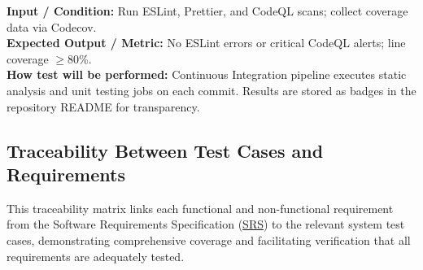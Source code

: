 \documentclass[12pt, titlepage]{article}
\begin{document}
    \textbf{Input / Condition:} Run ESLint, Prettier, and CodeQL scans; collect coverage data via Codecov. \\

    \textbf{Expected Output / Metric:} No ESLint errors or critical CodeQL alerts; line coverage $\geq 80$\%. \\

    \textbf{How test will be performed:}
    Continuous Integration pipeline executes static analysis and unit testing jobs on each commit. Results are stored as badges in the repository README for transparency.



\subsection{Traceability Between Test Cases and Requirements}
This traceability matrix links each functional and non-functional requirement from the Software Requirements Specification (\href{../SRS/SRS.pdf}{SRS}) to the relevant system test cases, demonstrating comprehensive coverage and facilitating verification that all requirements are adequately tested.
\end{document}
